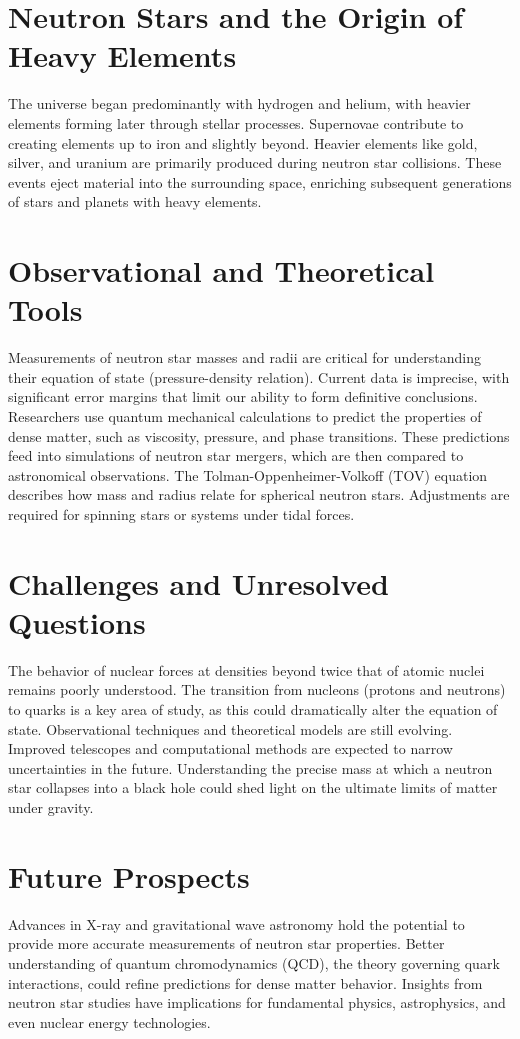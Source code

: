 \documentclass[12pt]{article}
\begin{document}
\section{Neutron Stars and the Origin of Heavy Elements}
    The universe began predominantly with hydrogen and helium, with heavier elements forming later through stellar processes. Supernovae contribute to creating elements up to iron and slightly beyond. Heavier elements like gold, silver, and uranium are primarily produced during neutron star collisions. These events eject material into the surrounding space, enriching subsequent generations of stars and planets with heavy elements.


\section{Observational and Theoretical Tools}
    Measurements of neutron star masses and radii are critical for understanding their equation of state (pressure-density relation). Current data is imprecise, with significant error margins that limit our ability to form definitive conclusions. Researchers use quantum mechanical calculations to predict the properties of dense matter, such as viscosity, pressure, and phase transitions. These predictions feed into simulations of neutron star mergers, which are then compared to astronomical observations. The Tolman-Oppenheimer-Volkoff (TOV) equation describes how mass and radius relate for spherical neutron stars. Adjustments are required for spinning stars or systems under tidal forces.

\section{Challenges and Unresolved Questions}
    The behavior of nuclear forces at densities beyond twice that of atomic nuclei remains poorly understood. The transition from nucleons (protons and neutrons) to quarks is a key area of study, as this could dramatically alter the equation of state. Observational techniques and theoretical models are still evolving. Improved telescopes and computational methods are expected to narrow uncertainties in the future. Understanding the precise mass at which a neutron star collapses into a black hole could shed light on the ultimate limits of matter under gravity.


\section{Future Prospects}
    Advances in X-ray and gravitational wave astronomy hold the potential to provide more accurate measurements of neutron star properties. Better understanding of quantum chromodynamics (QCD), the theory governing quark interactions, could refine predictions for dense matter behavior. Insights from neutron star studies have implications for fundamental physics, astrophysics, and even nuclear energy technologies.
\end{document}
